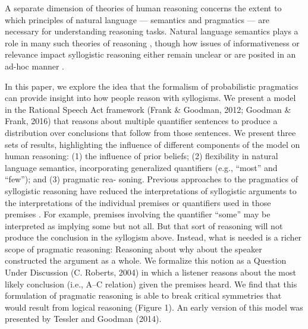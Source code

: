 \documentclass[floatsintext, man]{apa6}
\begin{document}
A separate dimension of theories of human reasoning concerns the extent to which principles of natural language — semantics and pragmatics — are necessary for understanding reasoning tasks. 
Natural language semantics plays a role in many such theories of reasoning \cite{JL1978, Khemlani2012, geurts2003reasoning}, though how issues of informativeness or relevance impact syllogistic reasoning either remain unclear \cite{Roberts2001} or are posited in an ad-hoc manner \cite{Chater1999}. 

In this paper, we explore the idea that the formalism of probabilistic pragmatics can provide insight into how people reason with syllogisms.
We present a model in the Rational Speech Act framework (Frank \& Goodman, 2012; Goodman \& Frank, 2016) that reasons about multiple quantifier sentences to produce a distribution over conclusions that follow from those sentences. We present three sets of results, highlighting the influence of different components of the model on human reasoning: (1) the influence of prior beliefs; (2) flexibility in natural language semantics, incorporating generalized quantifiers (e.g., “most” and “few”); and (3) pragmatic rea- soning. Previous approaches to the pragmatics of syllogistic reasoning have reduced the interpretations of syllogistic arguments to the interpretations of the individual premises or quantifiers used in those premises \cite{Roberts2001}. For example, premises involving the quantifier “some” may be interpreted as implying some but not all. But that sort of reasoning will not produce the conclusion in the syllogism above. Instead, what is needed is a richer scope of pragmatic reasoning: Reasoning about why about the speaker constructed the argument as a whole. We formalize this notion as a Question Under Discussion (C. Roberts, 2004) in which a listener reasons about the most likely conclusion (i.e., A–C relation) given the premises heard. We find that this formulation of pragmatic reasoning is able to break critical symmetries that would result from logical reasoning (Figure 1). An early version of this model was presented by Tessler and Goodman (2014).
\end{document}
